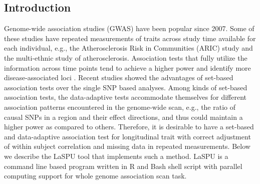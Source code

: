 \documentclass[12pt]{article}
\begin{document}
\subsection{Introduction}
Genome-wide association studies (GWAS) have been popular since 2007. Some of these studies have repeated measurements of traits across study time available for each individual, e.g., the Atherosclerosis Risk in Communities (ARIC) study\cite{Heiss1989} and the multi-ethnic study of atherosclerosis.\cite{Bild2002} Association tests that fully utilize the information across time points tend to achieve a higher power and identify more disease-associated loci \cite{Furlotte2012,Xu2014}. Recent studies showed the advantages of set-based association tests over the single SNP based analyses. Among kinds of set-based association tests, the data-adaptive tests accommodate themselves for different association patterns encountered in the genome-wide scan, e.g., the ratio of causal SNPs in a region and their effect directions, and thus could maintain a higher power as compared to others.\cite{Han2010,Sun2013,pan2014powerful,Derkach2013} Therefore, it is desirable to have a set-based and data-adaptive association test for longitudinal trait with correct adjustment of within subject correlation and missing data in repeated measurements. Below we describe the LaSPU tool that implements such a method. LaSPU is a command line based program written in R and Bash shell script with parallel computing support for whole genome association scan task.
\end{document}
